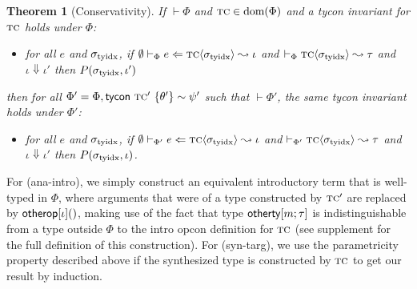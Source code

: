 \documentclass[10pt,preprint]{sigplanconf}
\newtheorem{theorem}{Theorem}
\newenvironment{proof-sketch}{\noindent{\emph{Proof Sketch.}}}{\qed}
\begin{document}
\begin{theorem}[Conservativity] If $\vdash \Phi$ and $\textsc{tc} \in \text{dom}(\Phi)$ and a tycon invariant for $\textsc{tc}$ holds under $\Phi$: \begin{itemize}
\item for all $e$ and $\sigma_\text{tyidx}$, if $\emptyset \vdash_{\Phi} e \Leftarrow {\textsc{tc}}\langle\sigma_\text{tyidx}\rangle \leadsto \iota$ and $\vdash_\Phi {{\textsc{tc}}\langle\sigma_\text{tyidx}\rangle} \leadsto \tau$ and $\iota \Downarrow \iota'$ then $P(\sigma_\text{tyidx}, \iota')$ 
\end{itemize} then for all $\Phi' = \Phi, {\sf tycon}~\textsc{tc}' ~\{\theta'\} \sim \psi'$ such that $\vdash \Phi'$, the same tycon invariant holds under $\Phi'$: \begin{itemize}
\item for all $e$ and $\sigma_\text{tyidx}$, if $\emptyset \vdash_{\Phi'} e \Leftarrow {\textsc{tc}}\langle\sigma_\text{tyidx}\rangle \leadsto \iota$ and $\vdash_{\Phi'}{{\textsc{tc}}\langle\sigma_\text{tyidx}\rangle}\leadsto{\tau}$ and $\iota \Downarrow \iota'$ then $P(\sigma_\text{tyidx}, \iota)$.
\end{itemize}
\end{theorem}
\begin{proof-sketch}
For (ana-intro), we simply construct an equivalent introductory term that is well-typed in $\Phi$, where arguments that were of a type constructed by $\textsc{tc}'$ are replaced by $\eother{\iota}$, making use of the fact that type ${\sf otherty}[m; \tau]$ is indistinguishable from a type outside $\Phi$ to the intro opcon definition for $\textsc{tc}$ (see supplement for the full definition of this construction). For (syn-targ), we use the parametricity property described above if the synthesized type is constructed by $\textsc{tc}$ to get our result by induction.
\end{proof-sketch}
\end{document}
